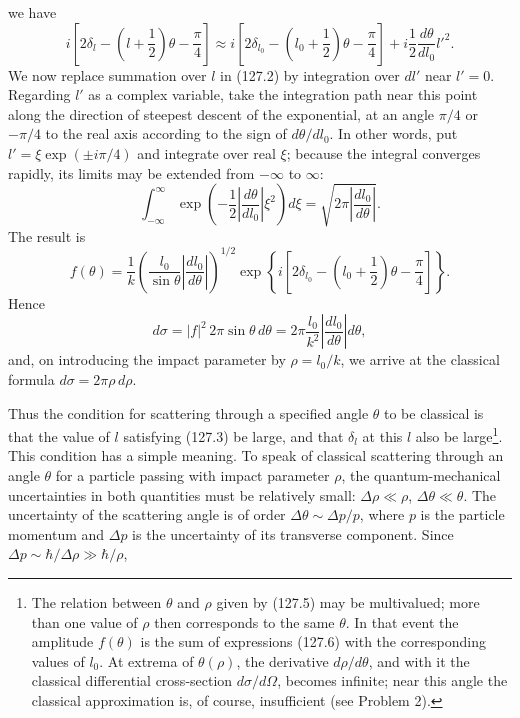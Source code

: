 we have
\[
 i\left[2\delta_l-\left(l+\frac12\right)\theta-\frac\pi4\right]
 \approx i\left[2\delta_{l_0}-\left(l_0+\frac12\right)\theta-\frac\pi4\right]
 +i\frac12\frac{d\theta}{dl_0}l'^2.
\]
We now replace summation over $l$ in (127.2) by integration over $dl'$ near
$l'=0$. Regarding $l'$ as a complex variable, take the integration path near
this point along the direction of steepest descent of the exponential, at an
angle $\pi/4$ or $-\pi/4$ to the real axis according to the sign of
$d\theta/dl_0$. In other words, put $l'=\xi\exp(\pm i\pi/4)$ and integrate
over real $\xi$; because the integral converges rapidly, its limits may be
extended from $-\infty$ to $\infty$:
\[
 \int_{-\infty}^{\infty}\exp\left(-\frac12\left|\frac{d\theta}{dl_0}\right|\xi^2\right)d\xi
 =\sqrt{2\pi\left|\frac{dl_0}{d\theta}\right|}.
\]
The result is
\begin{equation}
 f(\theta)=\frac1k\left(\frac{l_0}{\sin\theta}\left|\frac{dl_0}{d\theta}\right|\right)^{1/2}
 \exp\left\{i\left[2\delta_{l_0}-\left(l_0+\frac12\right)\theta-\frac\pi4\right]\right\}.
 \tag{127.6}
\end{equation}
Hence
\begin{equation}
 d\sigma=|f|^2\,2\pi\sin\theta\,d\theta
 =2\pi\frac{l_0}{k^2}\left|\frac{dl_0}{d\theta}\right|d\theta,
 \tag{127.7}
\end{equation}
and, on introducing the impact parameter by $\rho=l_0/k$, we arrive at the
classical formula $d\sigma=2\pi\rho\,d\rho$.

Thus the condition for scattering through a specified angle $\theta$ to be
classical is that the value of $l$ satisfying (127.3) be large, and that
$\delta_l$ at this $l$ also be large\footnote{The relation between $\theta$
and $\rho$ given by (127.5) may be multivalued; more than one value of $\rho$
then corresponds to the same $\theta$. In that event the amplitude $f(\theta)$
is the sum of expressions (127.6) with the corresponding values of $l_0$. At
extrema of $\theta(\rho)$, the derivative $d\rho/d\theta$, and with it the
classical differential cross-section $d\sigma/d\Omega$, becomes infinite;
near this angle the classical approximation is, of course, insufficient (see
Problem 2).}. This condition has a simple meaning. To speak of classical
scattering through an angle $\theta$ for a particle passing with impact
parameter $\rho$, the quantum-mechanical uncertainties in both quantities
must be relatively small: $\Delta\rho\ll\rho$, $\Delta\theta\ll\theta$. The
uncertainty of the scattering angle is of order $\Delta\theta\sim\Delta p/p$,
where $p$ is the particle momentum and $\Delta p$ is the uncertainty of its
transverse component. Since $\Delta p\sim\hbar/\Delta\rho\gg\hbar/\rho$,


